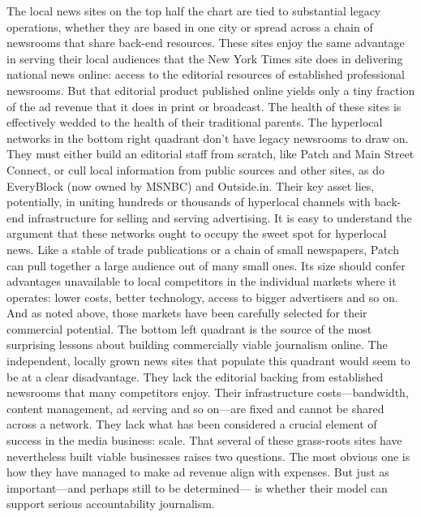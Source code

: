 The local news sites on the top half the chart are tied to substantial legacy
operations, whether they are based in one city or spread across a chain of newsrooms
that share back-end resources. These sites enjoy the same advantage in
serving their local audiences that the New York Times site does in delivering
national news online: access to the editorial resources of established professional
newsrooms. But that editorial product published online yields only a tiny fraction
of the ad revenue that it does in print or broadcast. The health of these sites
is effectively wedded to the health of their traditional parents.
The hyperlocal networks in the bottom right quadrant don’t have legacy
newsrooms to draw on. They must either build an editorial staff from scratch, like
Patch and Main Street Connect, or cull local information from public sources
and other sites, as do EveryBlock (now owned by MSNBC) and Outside.in.
Their key asset lies, potentially, in uniting hundreds or thousands of hyperlocal
channels with back-end infrastructure for selling and serving advertising.
It is easy to understand the argument that these networks ought to occupy
the sweet spot for hyperlocal news. Like a stable of trade publications or a chain
of small newspapers, Patch can pull together a large audience out of many small
ones. Its size should confer advantages unavailable to local competitors in the
individual markets where it operates: lower costs, better technology, access to bigger
advertisers and so on. And as noted above, those markets have been carefully
selected for their commercial potential.
The bottom left quadrant is the source of the most surprising lessons about
building commercially viable journalism online. The independent, locally grown
news sites that populate this quadrant would seem to be at a clear disadvantage.
They lack the editorial backing from established newsrooms that many competitors
enjoy. Their infrastructure costs—bandwidth, content management, ad serving
and so on—are fixed and cannot be shared across a network. They lack what
has been considered a crucial element of success in the media business: scale.
That several of these grass-roots sites have nevertheless built viable businesses
raises two questions. The most obvious one is how they have managed to make
ad revenue align with expenses. But just as important—and perhaps still to be determined—
is whether their model can support serious accountability journalism.

